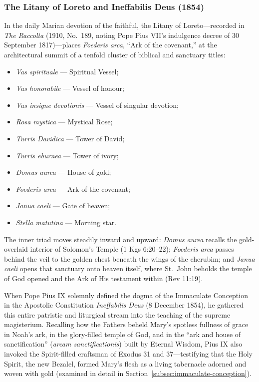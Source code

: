 \subsubsection{The Litany of Loreto and Ineffabilis Deus (1854)}

In the daily Marian devotion of the faithful, the Litany of Loreto---recorded in \textit{The Raccolta} (1910, No.\ 189, noting Pope Pius VII's indulgence decree of 30 September 1817)---places \textit{Foederis arca}, ``Ark of the covenant,'' at the architectural summit of a tenfold cluster of biblical and sanctuary titles:

\begin{itemize}
\item \textit{Vas spirituale} --- Spiritual Vessel;
\item \textit{Vas honorabile} --- Vessel of honour;
\item \textit{Vas insigne devotionis} --- Vessel of singular devotion;
\item \textit{Rosa mystica} --- Mystical Rose;
\item \textit{Turris Davidica} --- Tower of David;
\item \textit{Turris eburnea} --- Tower of ivory;
\item \textit{Domus aurea} --- House of gold;
\item \textit{Foederis arca} --- Ark of the covenant;
\item \textit{Janua caeli} --- Gate of heaven;
\item \textit{Stella matutina} --- Morning star.
\end{itemize}

The inner triad moves steadily inward and upward: \textit{Domus aurea} recalls the gold-overlaid interior of Solomon's Temple (1 Kgs 6:20--22); \textit{Foederis arca} passes behind the veil to the golden chest beneath the wings of the cherubim; and \textit{Janua caeli} opens that sanctuary onto heaven itself, where St.\ John beholds the temple of God opened and the Ark of His testament within (Rev 11:19).

When Pope Pius IX solemnly defined the dogma of the Immaculate Conception in the Apostolic Constitution \textit{Ineffabilis Deus} (8 December 1854), he gathered this entire patristic and liturgical stream into the teaching of the supreme magisterium. Recalling how the Fathers beheld Mary's spotless fullness of grace in Noah's ark, in the glory-filled temple of God, and in the ``ark and house of sanctification'' (\textit{arcam sanctificationis}) built by Eternal Wisdom, Pius IX also invoked the Spirit-filled craftsman of Exodus 31 and 37---testifying that the Holy Spirit, the new Bezalel, formed Mary's flesh as a living tabernacle adorned and woven with gold (examined in detail in Section~\ref{subsec:immaculate-conception}).
